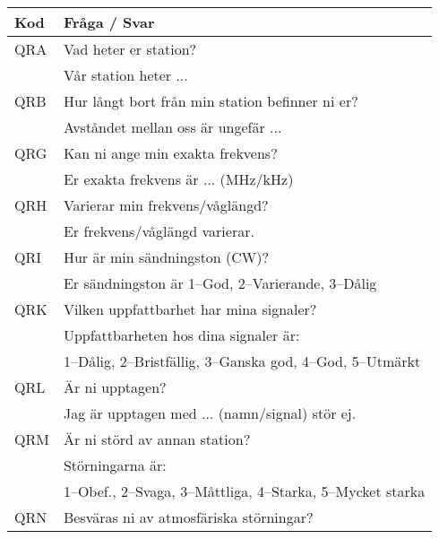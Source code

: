 \documentclass[10pt,swedish,a4paper]{article}
\begin{document}
\begin{longtable}{ll}
	\textbf{Kod} & \textbf{Fråga / Svar}                                                 \\ \hline
	QRA          & Vad heter er station?                                                 \\
	             & Vår station heter ...                                                 \\ \hline
	QRB          & Hur långt bort från min station befinner ni er?                       \\
	             & Avståndet mellan oss är ungefär ...                                   \\ \hline
	QRG          & Kan ni ange min exakta frekvens?                                      \\
	             & Er exakta frekvens är ... (MHz/kHz)                                   \\ \hline
	QRH          & Varierar min frekvens/våglängd?                                       \\
	             & Er frekvens/våglängd varierar.                                        \\ \hline
	QRI          & Hur är min sändningston (CW)?                                         \\
	             & Er sändningston är 1--God, 2--Varierande, 3--Dålig                    \\ \hline
	QRK          & Vilken uppfattbarhet har mina signaler?                               \\
	             & Uppfattbarheten hos dina signaler är:                                 \\
	             & 1--Dålig, 2--Bristfällig, 3--Ganska god, 4--God, 5--Utmärkt           \\ \hline
	QRL          & Är ni upptagen?                                                       \\
	             & Jag är upptagen med ... (namn/signal) stör ej.                        \\ \hline
	QRM          & Är ni störd av annan station?                                         \\
	             & Störningarna är:                                                      \\
	             & 1--Obef., 2--Svaga, 3--Måttliga, 4--Starka, 5--Mycket starka          \\ \hline
	QRN          & Besväras ni av atmosfäriska störningar?                               \\

\end{longtable}
\end{document}
